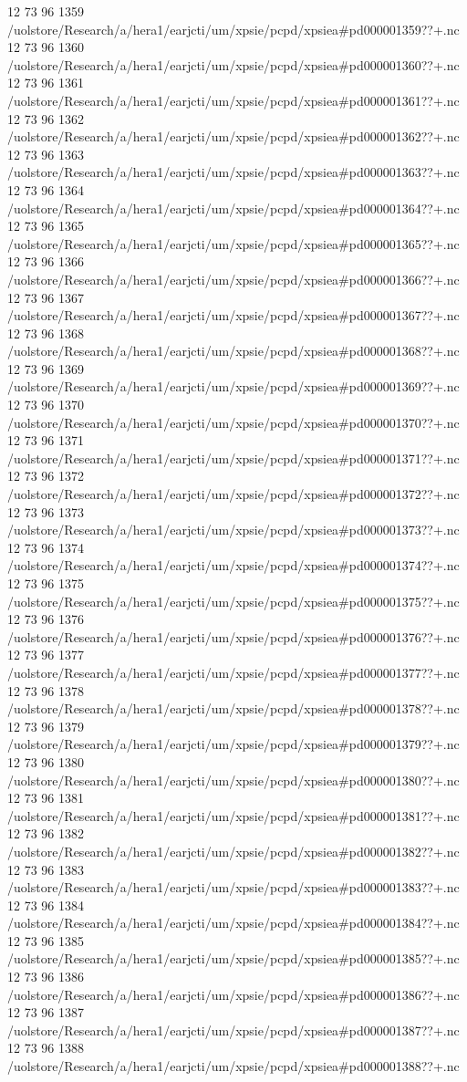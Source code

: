 12 73 96
1359
/uolstore/Research/a/hera1/earjcti/um/xpsie/pcpd/xpsiea#pd000001359??+.nc
12 73 96
1360
/uolstore/Research/a/hera1/earjcti/um/xpsie/pcpd/xpsiea#pd000001360??+.nc
12 73 96
1361
/uolstore/Research/a/hera1/earjcti/um/xpsie/pcpd/xpsiea#pd000001361??+.nc
12 73 96
1362
/uolstore/Research/a/hera1/earjcti/um/xpsie/pcpd/xpsiea#pd000001362??+.nc
12 73 96
1363
/uolstore/Research/a/hera1/earjcti/um/xpsie/pcpd/xpsiea#pd000001363??+.nc
12 73 96
1364
/uolstore/Research/a/hera1/earjcti/um/xpsie/pcpd/xpsiea#pd000001364??+.nc
12 73 96
1365
/uolstore/Research/a/hera1/earjcti/um/xpsie/pcpd/xpsiea#pd000001365??+.nc
12 73 96
1366
/uolstore/Research/a/hera1/earjcti/um/xpsie/pcpd/xpsiea#pd000001366??+.nc
12 73 96
1367
/uolstore/Research/a/hera1/earjcti/um/xpsie/pcpd/xpsiea#pd000001367??+.nc
12 73 96
1368
/uolstore/Research/a/hera1/earjcti/um/xpsie/pcpd/xpsiea#pd000001368??+.nc
12 73 96
1369
/uolstore/Research/a/hera1/earjcti/um/xpsie/pcpd/xpsiea#pd000001369??+.nc
12 73 96
1370
/uolstore/Research/a/hera1/earjcti/um/xpsie/pcpd/xpsiea#pd000001370??+.nc
12 73 96
1371
/uolstore/Research/a/hera1/earjcti/um/xpsie/pcpd/xpsiea#pd000001371??+.nc
12 73 96
1372
/uolstore/Research/a/hera1/earjcti/um/xpsie/pcpd/xpsiea#pd000001372??+.nc
12 73 96
1373
/uolstore/Research/a/hera1/earjcti/um/xpsie/pcpd/xpsiea#pd000001373??+.nc
12 73 96
1374
/uolstore/Research/a/hera1/earjcti/um/xpsie/pcpd/xpsiea#pd000001374??+.nc
12 73 96
1375
/uolstore/Research/a/hera1/earjcti/um/xpsie/pcpd/xpsiea#pd000001375??+.nc
12 73 96
1376
/uolstore/Research/a/hera1/earjcti/um/xpsie/pcpd/xpsiea#pd000001376??+.nc
12 73 96
1377
/uolstore/Research/a/hera1/earjcti/um/xpsie/pcpd/xpsiea#pd000001377??+.nc
12 73 96
1378
/uolstore/Research/a/hera1/earjcti/um/xpsie/pcpd/xpsiea#pd000001378??+.nc
12 73 96
1379
/uolstore/Research/a/hera1/earjcti/um/xpsie/pcpd/xpsiea#pd000001379??+.nc
12 73 96
1380
/uolstore/Research/a/hera1/earjcti/um/xpsie/pcpd/xpsiea#pd000001380??+.nc
12 73 96
1381
/uolstore/Research/a/hera1/earjcti/um/xpsie/pcpd/xpsiea#pd000001381??+.nc
12 73 96
1382
/uolstore/Research/a/hera1/earjcti/um/xpsie/pcpd/xpsiea#pd000001382??+.nc
12 73 96
1383
/uolstore/Research/a/hera1/earjcti/um/xpsie/pcpd/xpsiea#pd000001383??+.nc
12 73 96
1384
/uolstore/Research/a/hera1/earjcti/um/xpsie/pcpd/xpsiea#pd000001384??+.nc
12 73 96
1385
/uolstore/Research/a/hera1/earjcti/um/xpsie/pcpd/xpsiea#pd000001385??+.nc
12 73 96
1386
/uolstore/Research/a/hera1/earjcti/um/xpsie/pcpd/xpsiea#pd000001386??+.nc
12 73 96
1387
/uolstore/Research/a/hera1/earjcti/um/xpsie/pcpd/xpsiea#pd000001387??+.nc
12 73 96
1388
/uolstore/Research/a/hera1/earjcti/um/xpsie/pcpd/xpsiea#pd000001388??+.nc
